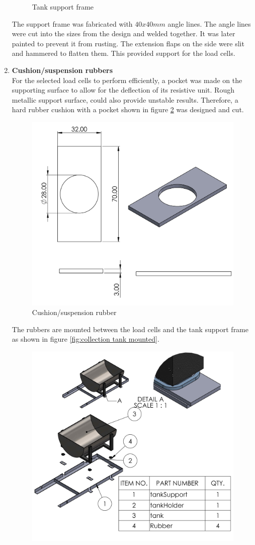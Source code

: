 \begin{enumerate}
\begin{figure}[H]
    \caption{Tank support frame}
    \label{fig:tank_support_frame}
\end{figure}
 The support frame was fabricated with $40x40 mm$ angle lines. The angle lines were cut into the sizes from the design and welded together. It was later painted to prevent it from rusting. The extension flaps on the side were slit and hammered to flatten them. This provided support for the load cells.
       \item \textbf{Cushion/suspension rubbers}\\
 For the selected load cells to perform efficiently, a pocket was made on the supporting surface to allow for the deflection of its resistive unit. Rough metallic support surface, could also provide unstable results. Therefore, a hard rubber cushion with a pocket shown in figure \ref{fig:cushion_rubber}  was designed and cut.
 \begin{figure}[H]
     \centering
     \includegraphics[width=.6\textwidth]{Figures/Rubber.JPG}
     \caption{Cushion/suspension rubber}
     \label{fig:cushion_rubber}
 \end{figure}
The rubbers are mounted between the load cells and the tank support frame as shown in figure \ref{fig:collection tank mounted}.
\begin{figure}[H]
    \centering
    \includegraphics{Figures/CollectiontankWithSupports.JPG}

\end{figure}
\end{enumerate}
